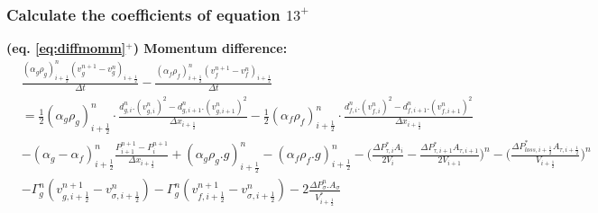 \documentclass[11pt,letterpaper,titlepage]{article}
\newcommand{\half}{\frac{1}{2}}
\begin{document}
\subsubsection{Calculate the coefficients of equation $13^+$}
\textbf{(eq. \ref{eq:diffmomm}$^+$) Momentum difference:}
\begin{equation*}
\begin{aligned}
&\frac{(\alpha_g\rho_g )_{i+\half}^n (v_g^{n+1} -v_g^{n})_{i+\half}}{\Delta t}
-\frac{(\alpha_f\rho_f )_{i+\half}^n (v_f^{n+1} -v_f^{n})_{i+\half}}{\Delta t}\\
&=\half (\alpha_g \rho_{g})_{i+\half}^n \cdot\frac{d_{g,i}^n.(v_{g,i}^n)^2-d_{g,i+1}^n.(v_{g,i+1}^n)^2}{\Delta x_{i+\half}} 
-\half (\alpha_f \rho_{f})_{i+\half}^n \cdot\frac{d_{f,i}^n.(v_{f,i}^n)^2-d_{f,i+1}^n.(v_{f,i+1}^n)^2}{\Delta x_{i+\half}} \\
&-(\alpha_g-\alpha_f)_{i+\half}^n\frac{P_{i+1}^{n+1}-P_i^{n+1} }{\Delta x_{i+\half}} + (\alpha_g \rho_{g}.g)_{i+\half}^n - (\alpha_f \rho_{f}.g)_{i+\half}^n 
-\biggr(\frac{\Delta P_{\tau,i}^*A_i}{2V_i}-\frac{\Delta P_{\tau,i+1}^*A_{\tau,i+1}}{2V_{i+1}}\biggr)^n 
-\biggr(\frac{\Delta P_{loss,i+\half}^*A_{\tau,i+\half}}{V_{i+\half}}\biggr)^n\\
& - \Gamma_g^n (v_{g,i+\half}^{n+1} - v_{\sigma,i+\half}^n)- \Gamma_g^n (v_{f,i+\half}^{n+1} - v_{\sigma,i+\half}^n)-2\frac{\Delta P_{\sigma}^n.A_{\sigma}}{V_{i+\half}^*}
\end{aligned}
\end{equation*}

\end{document}
